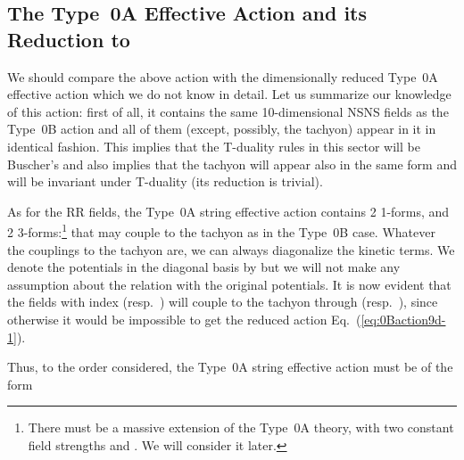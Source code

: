 \documentclass[12pt,a4paper]{article}
\begin{document}

\subsection{The Type~0A Effective Action and its Reduction to \coordHE{}}

We should compare the above action with the dimensionally reduced
Type~0A effective action which we do not know in detail. Let us
summarize our knowledge of this action: first of all, it contains the
same 10-dimensional NSNS fields as the Type~0B action and all of them
(except, possibly, the tachyon) appear in it in identical fashion.
This implies that the T-duality rules in this sector will be Buscher's
and also implies that the tachyon will appear also in the same form
and will be invariant under T-duality (its reduction is trivial).

As for the RR fields, the Type~0A string effective action contains 2
1-forms, and 2 3-forms:\footnote{There must be a massive extension of
  the Type~0A theory, with two constant
  field strengths \coordHE{} and \coordHE{}. We will
  consider it later.}
\coordHE{}
that may couple to the tachyon as in the Type~0B case.  Whatever the
couplings to the tachyon are, we can always diagonalize the kinetic
terms. We denote the potentials in the diagonal basis by
\coordHE{}
but we will not make any assumption about the relation with the
original potentials. It is now evident that the fields with index \myHighlight{$+$}\coordHE{}
(resp.~\myHighlight{$-$}\coordHE{}) will couple to the tachyon through \coordHE{}
(resp.~\coordHE{}), since otherwise it would be impossible to get the
reduced action Eq.~(\ref{eq:0Baction9d-1}).

Thus, to the order considered, the Type~0A string effective action
must be of the form
\end{document}
